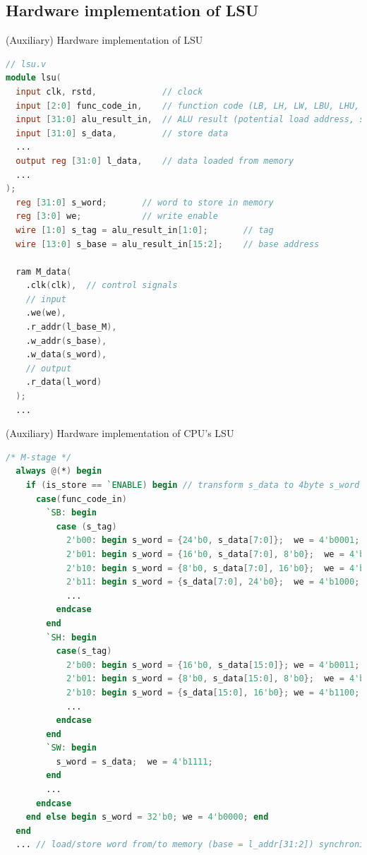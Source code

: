 \documentclass[dvipdfmx, 11pt, aspectratio=169]{beamer}   %
\begin{document}
\subsection{Hardware implementation of LSU}
\begin{frame}[fragile]{(Auxiliary) Hardware implementation of LSU}
  \vspace{-1.5\baselineskip}
    \begin{lstlisting}[language=verilog, basicstyle=\ttfamily\tiny]
// lsu.v
module lsu(
  input clk, rstd,             // clock
  input [2:0] func_code_in,    // function code (LB, LH, LW, LBU, LHU, SB, SH, SW)
  input [31:0] alu_result_in,  // ALU result (potential load address, store address)
  input [31:0] s_data,         // store data
  ...
  output reg [31:0] l_data,    // data loaded from memory
  ...
);
  reg [31:0] s_word;       // word to store in memory
  reg [3:0] we;            // write enable
  wire [1:0] s_tag = alu_result_in[1:0];       // tag
  wire [13:0] s_base = alu_result_in[15:2];    // base address
  
  ram M_data(
    .clk(clk),  // control signals
    // input
    .we(we),
    .r_addr(l_base_M), 
    .w_addr(s_base),
    .w_data(s_word),
    // output
    .r_data(l_word)
  );
  ...
\end{lstlisting}
\end{frame}
\begin{frame}[fragile]{(Auxiliary) Hardware implementation of CPU's LSU}
  \vspace{-1.5\baselineskip}
    \begin{lstlisting}[language=verilog, basicstyle=\ttfamily\tiny]
  /* M-stage */
  always @(*) begin
    if (is_store == `ENABLE) begin // transform s_data to 4byte s_word as it corresponds to we
      case(func_code_in)
        `SB: begin
          case (s_tag)
            2'b00: begin s_word = {24'b0, s_data[7:0]};  we = 4'b0001; end
            2'b01: begin s_word = {16'b0, s_data[7:0], 8'b0};  we = 4'b0010; end
            2'b10: begin s_word = {8'b0, s_data[7:0], 16'b0};  we = 4'b0100; end
            2'b11: begin s_word = {s_data[7:0], 24'b0};  we = 4'b1000; end
            ...
          endcase
        end
        `SH: begin
          case(s_tag)
            2'b00: begin s_word = {16'b0, s_data[15:0]}; we = 4'b0011; end
            2'b01: begin s_word = {8'b0, s_data[15:0], 8'b0};  we = 4'b0110; end
            2'b10: begin s_word = {s_data[15:0], 16'b0}; we = 4'b1100; end
            ...
          endcase
        end
        `SW: begin 
          s_word = s_data;  we = 4'b1111;
        end
        ...
      endcase
    end else begin s_word = 32'b0; we = 4'b0000; end
  end
  ... // load/store word from/to memory (base = l_addr[31:2]) synchronized with clk
\end{lstlisting}
\end{frame}
\end{document}
